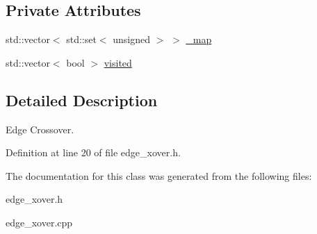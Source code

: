 \subsection*{Private Attributes}
\begin{CompactItemize}
\item 
\hypertarget{classEdgeXover_d41399c6effb54ee48c722f1e19cb3c3}{
std::vector$<$ std::set$<$ unsigned $>$ $>$ \hyperlink{classEdgeXover_d41399c6effb54ee48c722f1e19cb3c3}{\_\-map}}
\label{classEdgeXover_d41399c6effb54ee48c722f1e19cb3c3}

\item 
\hypertarget{classEdgeXover_46d4d4724cf6d660b1a7ab4a346573d4}{
std::vector$<$ bool $>$ \hyperlink{classEdgeXover_46d4d4724cf6d660b1a7ab4a346573d4}{visited}}
\label{classEdgeXover_46d4d4724cf6d660b1a7ab4a346573d4}

\end{CompactItemize}


\subsection{Detailed Description}
Edge Crossover. 



Definition at line 20 of file edge\_\-xover.h.

The documentation for this class was generated from the following files:\begin{CompactItemize}
\item 
edge\_\-xover.h\item 
edge\_\-xover.cpp\end{CompactItemize}
